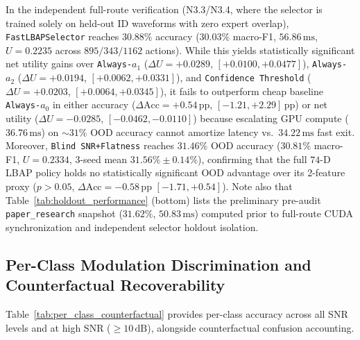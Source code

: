 In the independent full-route verification (N3.3/N3.4, where the selector is trained solely on held-out ID waveforms with zero expert overlap), \texttt{FastLBAPSelector} reaches $30.88\%$ accuracy ($30.03\%$ macro-F1, $56.86\,\mathrm{ms}$, $U = 0.2235$ across $895/343/1162$ actions). While this yields statistically significant net utility gains over \texttt{Always-$a_1$} ($\Delta U = +0.0289$, $[+0.0100, +0.0477]$), \texttt{Always-$a_2$} ($\Delta U = +0.0194$, $[+0.0062, +0.0331]$), and \texttt{Confidence Threshold} ($\Delta U = +0.0203$, $[+0.0064, +0.0345]$), it fails to outperform cheap baseline \texttt{Always-$a_0$} in either accuracy ($\Delta\mathrm{Acc} = +0.54\,\mathrm{pp}$, $[-1.21, +2.29]\,\mathrm{pp}$) or net utility ($\Delta U = -0.0285$, $[-0.0462, -0.0110]$) because escalating GPU compute ($36.76\,\mathrm{ms}$) on $\sim 31\%$ OOD accuracy cannot amortize latency vs.\ $34.22\,\mathrm{ms}$ fast exit. Moreover, \texttt{Blind SNR+Flatness} reaches $31.46\%$ OOD accuracy ($30.81\%$ macro-F1, $U = 0.2334$, 3-seed mean $31.56\% \pm 0.14\%$), confirming that the full $74$-D LBAP policy holds no statistically significant OOD advantage over its 2-feature proxy ($p>0.05$, $\Delta\mathrm{Acc} = -0.58\,\mathrm{pp}$ $[-1.71, +0.54]$). Note also that Table~\ref{tab:holdout_performance} (bottom) lists the preliminary pre-audit \texttt{paper\_research} snapshot ($31.62\%$, $50.83\,\mathrm{ms}$) computed prior to full-route CUDA synchronization and independent selector holdout isolation.

\subsection{Per-Class Modulation Discrimination and Counterfactual Recoverability}
\label{subsec:per_class_recoverability}

Table~\ref{tab:per_class_counterfactual} provides per-class accuracy across all SNR levels and at high SNR ($\ge 10\,\mathrm{dB}$), alongside counterfactual confusion accounting.

